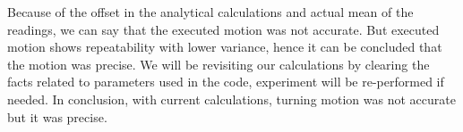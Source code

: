 Because of the offset in the analytical calculations and actual mean of the readings, we can say that the executed motion was not accurate. But executed motion shows repeatability with lower variance, hence it can be concluded that the motion was precise. We will be revisiting our calculations by clearing the facts related to parameters used in the code, experiment will be re-performed if needed. In conclusion, with current calculations, turning motion was not accurate but it was precise. 
